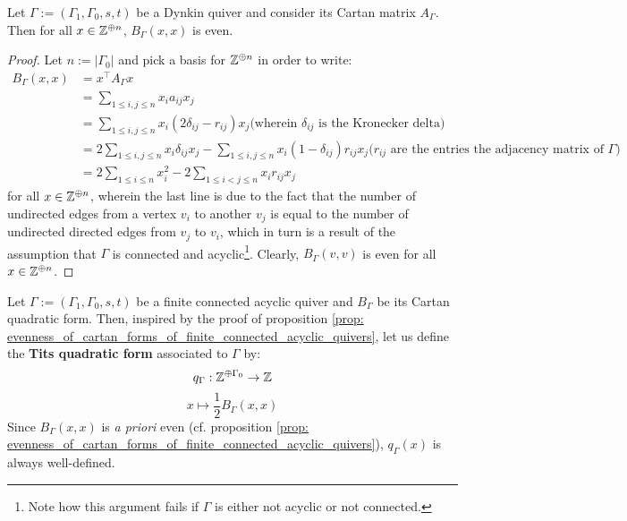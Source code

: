             \begin{proposition} \label{prop: evenness_of_cartan_forms_of_finite_connected_acyclic_quivers}
                Let $\Gamma := (\Gamma_1, \Gamma_0, s, t)$ be a Dynkin quiver and consider its Cartan matrix $A_{\Gamma}$. Then for all $x \in \mathbb{Z}^{\oplus n}$, $B_{\Gamma}(x, x)$ is even.  
            \end{proposition}
                \begin{proof}
                    Let $n := |\Gamma_0|$ and pick a basis for $\mathbb{Z}^{\oplus n}$ in order to write:
                        $$
                            \begin{aligned}
                                B_{\Gamma}(x, x) & = x^{\top} A_{\Gamma} x
                                \\
                                & = \sum_{1 \leq i, j \leq n} x_i a_{ij} x_j
                                \\
                                & = \sum_{1 \leq i, j \leq n} x_i (2\delta_{ij} - r_{ij}) x_j \text{(wherein $\delta_{ij}$ is the Kronecker delta)}
                                \\
                                & = 2\sum_{1 \leq i, j \leq n} x_i \delta_{ij} x_j - \sum_{1 \leq i, j \leq n} x_i (1 - \delta_{ij}) r_{ij} x_j \text{($r_{ij}$ are the entries the adjacency matrix of $\Gamma$)}
                                \\
                                & = 2\sum_{1 \leq i \leq n} x_i^2 - 2\sum_{1 \leq i < j \leq n} x_i r_{ij} x_j
                            \end{aligned}
                        $$
                    for all $x \in \mathbb{Z}^{\oplus n}$, wherein the last line is due to the fact that the number of undirected edges from a vertex $v_i$ to another $v_j$ is equal to the number of undirected directed edges from $v_j$ to $v_i$, which in turn is a result of the assumption that $\Gamma$ is connected and acyclic\footnote{Note how this argument fails if $\Gamma$ is either not acyclic or not connected.}. Clearly, $B_{\Gamma}(v, v)$ is even for all $x \in \mathbb{Z}^{\oplus n}$.
                \end{proof}
            \begin{definition} \label{def: tits_quadratic_forms}
                Let $\Gamma := (\Gamma_1, \Gamma_0, s, t)$ be a finite connected acyclic quiver and $B_{\Gamma}$ be its Cartan quadratic form. Then, inspired by the proof of proposition \ref{prop: evenness_of_cartan_forms_of_finite_connected_acyclic_quivers}, let us define the \textbf{Tits quadratic form} associated to $\Gamma$ by:
                    $$q_{\Gamma}: \mathbb{Z}^{\oplus \Gamma_0} \to \mathbb{Z}$$
                    $$x \mapsto \frac12 B_{\Gamma}(x, x)$$
                Since $B_{\Gamma}(x, x)$ is \textit{a priori} even (cf. proposition \ref{prop: evenness_of_cartan_forms_of_finite_connected_acyclic_quivers}), $q_{\Gamma}(x)$ is always well-defined. 
            \end{definition}
